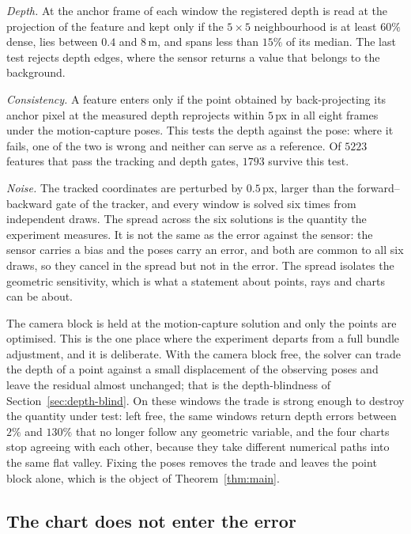 \documentclass[11pt,a4paper]{article}
\theoremstyle{definition}
\theoremstyle{remark}
\begin{document}
\emph{Depth.} At the anchor frame of each window the registered depth is read at the projection of the feature and kept only if the $5\times5$ neighbourhood is at least $60\%$ dense, lies between $0.4$ and $8$\,m, and spans less than $15\%$ of its median. The last test rejects depth edges, where the sensor returns a value that belongs to the background.

\emph{Consistency.} A feature enters only if the point obtained by back-projecting its anchor pixel at the measured depth reprojects within $5$\,px in all eight frames under the motion-capture poses. This tests the depth against the pose: where it fails, one of the two is wrong and neither can serve as a reference. Of $5223$ features that pass the tracking and depth gates, $1793$ survive this test.

\emph{Noise.} The tracked coordinates are perturbed by $0.5$\,px, larger than the forward--backward gate of the tracker, and every window is solved six times from independent draws. The spread across the six solutions is the quantity the experiment measures. It is not the same as the error against the sensor: the sensor carries a bias and the poses carry an error, and both are common to all six draws, so they cancel in the spread but not in the error. The spread isolates the geometric sensitivity, which is what a statement about points, rays and charts can be about.

The camera block is held at the motion-capture solution and only the points are optimised. This is the one place where the experiment departs from a full bundle adjustment, and it is deliberate. With the camera block free, the solver can trade the depth of a point against a small displacement of the observing poses and leave the residual almost unchanged; that is the depth-blindness of Section~\ref{sec:depth-blind}. On these windows the trade is strong enough to destroy the quantity under test: left free, the same windows return depth errors between $2\%$ and $130\%$ that no longer follow any geometric variable, and the four charts stop agreeing with each other, because they take different numerical paths into the same flat valley. Fixing the poses removes the trade and leaves the point block alone, which is the object of Theorem~\ref{thm:main}.

\subsection{The chart does not enter the error}
\end{document}
